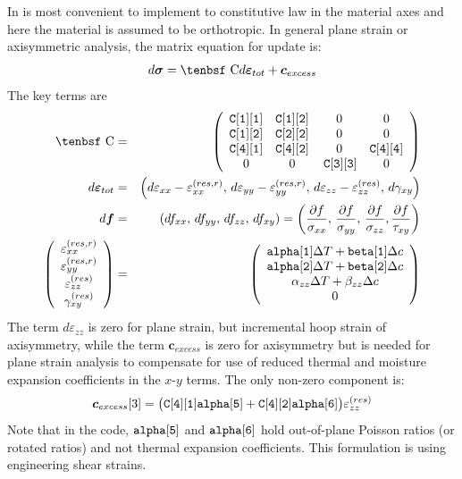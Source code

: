 \documentclass[11pt]{book}
\renewcommand{\vec}[1]{\boldsymbol{#1}}
\def\a#1{\alpha_{#1}}
\def\b#1{\beta_{#1}}
\def\C{\hbox{\tenbsf C}}
\def\cex{\vec{c}_{excess}}
\def\code#1{{\small\tt #1}}
\def\deff{d \vec{\varepsilon}_{tot}}
\def\df{d \vec{f}}
\def\dsig{d \vec{\sigma}}
\def\DT{\Delta T}
\def\e#1{\varepsilon_{#1}}
\def\er#1{\varepsilon_{#1}^{(res)}}
\def\err#1{\varepsilon_{#1}^{(res,r)}}
\def\g#1{\gamma_{#1}}
\begin{document}
In is most convenient to implement to constitutive law in the material axes and here the material is assumed to be orthotropic.
In general plane strain or axisymmetric analysis, the matrix equation for update is:
\begin{equation}
    \dsig = \C \deff +\cex
\end{equation}
The key terms are
\begin{eqnarray}
      \C & = & \left(\begin{array}{cccc} \code{C[1][1]}  & \code{C[1][2]}  & 0  & 0   \\
                    \code{C[1][2]}  & \code{C[2][2]}  & 0  & 0 \\
                            \code{C[4][1]}  & \code{C[4][2]}  & 0  & \code{C[4][4]}  \\
                 0  & 0  & \thinspace\code{C[3][3]}  & 0 \end{array}\right)  \\
      \deff & = & \left(d\e{xx} - \err{xx}, \thinspace d\e{yy} - \err{yy}, \thinspace d\e{zz} -  \er{zz}, 
              \thinspace d\g{xy}\right) \\
      \df & = & (df_{xx}, \thinspace df_{yy}, \thinspace df_{zz}, \thinspace df_{xy})
                  = \left({\partial f\over \sigma_{xx}}, \thinspace {\partial f\over \sigma_{yy}}, \thinspace {\partial f\over \sigma_{zz}},
                                {\partial f\over \tau_{xy}}\right)  \\
\left(\begin{array}{c} \err{xx} \\ \err{yy} \\ \er{zz} \\ \gamma_{xy}^{(res)} \end{array}\right)
       & = &  \left(\begin{array}{c}
	\code{alpha[1]}\DT + \code{beta[1]}\Delta c \\
	\code{alpha[2]}\DT + \code{beta[2]}\Delta c \\
	\a{zz}\DT + \b{zz}\Delta c \\
	0  \end{array}\right) 
 \end{eqnarray}
The term $d\e{zz}$ is zero for plane strain, but incremental hoop strain of axisymmetry, while the term $\cex$ is zero for axisymmetry but is needed for plane strain analysis to compensate for use of reduced thermal and moisture expansion coefficients in the $x$-$y$ terms. The only non-zero component is:
\begin{equation}
      \cex[3] = \bigl(\code{C[4][1]}\code{alpha[5]}
              + \code{C[4][2]}\code{alpha[6]}\bigr)\er{zz} 
\end{equation}
Note that in the code, $\code{alpha[5]}$ and $\code{alpha[6]}$ hold out-of-plane Poisson ratios (or rotated ratios) and not thermal expansion coefficients.
This formulation is using engineering shear strains. 
 
\end{document}
